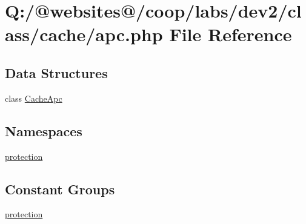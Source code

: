 \hypertarget{apc_8php}{\section{Q\-:/@websites@/coop/labs/dev2/class/cache/apc.php File Reference}
\label{apc_8php}
}
\subsection*{Data Structures}
\begin{DoxyCompactItemize}
\item 
class \hyperlink{class_cache_apc}{Cache\-Apc}
\end{DoxyCompactItemize}
\subsection*{Namespaces}
\begin{DoxyCompactItemize}
\item 
\hyperlink{namespaceprotection}{protection}
\end{DoxyCompactItemize}
\subsection*{Constant Groups}
\begin{DoxyCompactItemize}
\item 
\hyperlink{namespaceprotection}{protection}
\end{DoxyCompactItemize}

